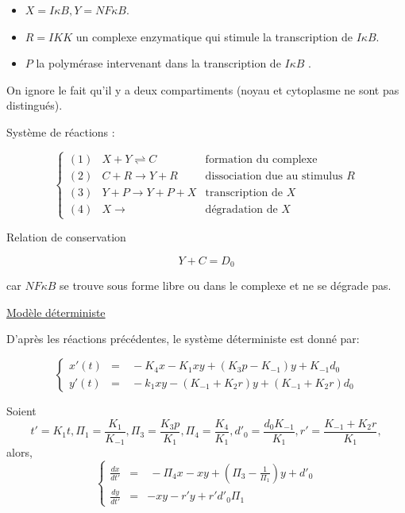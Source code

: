 \documentclass{article}
\def\mblue{\color{MidnightBlue}}
\begin{document}
\begin{itemize} \large \mblue
\item[]
$X=I\kappa B, Y=NF\kappa B$.
\item[]
$R=IKK$ un complexe enzymatique qui stimule la transcription de $I\kappa B$.
\item[]
$P$ la polym{\'e}rase intervenant dans la transcription de $I\kappa B$  .
\end{itemize}

 On ignore le fait qu'il y a deux compartiments
 (noyau et cytoplasme ne sont pas distingu{\'e}s).


Syst{\`e}me de r{\'e}actions :

\[
  \left \{
 \begin{array}{lll}
(1) &  X+Y\rightleftharpoons C  & \textrm{formation du complexe}\\
(2) & C+R \to Y+R  &  \textrm{dissociation due au stimulus $R$} \\
(3)  & Y+P\to Y+P+X  & \textrm{transcription de $X$} \\
(4) & X\to   & \textrm{d{\'e}gradation de $X$}
\end{array} \right.
\]

Relation de conservation

\begin{equation}
 Y+C=D_0
\end{equation}

car $NF\kappa B$ se trouve sous forme libre ou dans le complexe et
ne se d{\'e}grade pas.


\underline{Mod{\`e}le d{\'e}terministe}


D'apr{\`e}s les r{\'e}actions pr{\'e}c{\'e}dentes, le syst{\`e}me d{\'e}terministe est donn{\'e} par:

\[
  \left \{
 \begin{array}{lll}
x'(t) & = & \ -K_4x-K_1xy+(K_3p-K_{-1})y+K_{-1}d_0 \\
y'(t) & = & \ -k_1xy-(K_{-1}+K_2r)y+(K_{-1}+K_2r)d_0
 \end{array} \right.
\]

Soient
\[
t'=K_1t, \Pi_1=\frac{K_1}{K_{-1}}, \Pi_3=\frac{K_3p}{K_1}, \Pi_4=\frac{K_4}{K_1},d'_0=\frac{d_0K_{-1}}{K_1}, r'=\frac{K_{-1}+K_2r}{K_1},
\]
alors,
\[
  \left \{
 \begin{array}{lll}
\frac{dx}{dt'} & = & \ - \Pi_4x-xy+ (\Pi_3-\frac{1}{ \Pi_1})y+ d'_0 \\
\frac{dy}{dt'} & = & -xy- r'y+ r'd'_0 \Pi_1
 \end{array} \right.
\]
\end{document}
